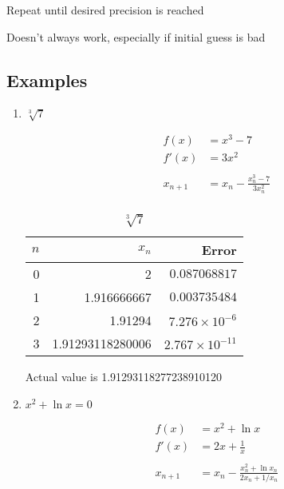 \documentclass[letterpaper, landscape]{exam}
\begin{document}
  \begin{itemize*}
    \item Repeat until desired precision is reached
    \item Doesn't always work, especially if initial guess is bad
  \end{itemize*}

  \subsection{Examples} %
  
  \begin{enumerate}
    \item $\sqrt[3]{7}$

      \begin{align*}
        f(x)      & = x^3 - 7\\
        f'(x)     & = 3x^2 \\
        \\
        x_{n + 1} & = x_n - \frac{x_n^3 - 7}{3x_n^2} \\
      \end{align*}

      \begin{table}[H]
        \centering
        \begin{tabular}[H]{rrr}
          \toprule
          $n$ & $x_n$            & Error \\
          \midrule
          0   & 2                & $0.087068817$ \\
          1   & 1.916666667      & $0.003735484$ \\
          2   & 1.91294          & $7.276 \times 10^{-6}$ \\
          3   & 1.91293118280006 & $2.767 \times 10^{-11}$ \\
          \bottomrule
        \end{tabular}
        \caption{$\sqrt[3]{7}$}
      \end{table}

      Actual value is 1.91293118277238910120 

    \item $x^2 + \ln x = 0$

      \begin{align*}
        f(x)      & = x^2 + \ln x \\
        f'(x)     & = 2x + \frac{1}{x} \\
        \\
        x_{n + 1} & = x_n - \frac{x_n^2 + \ln x_n}{2x_n + 1/x_n} \\
      \end{align*}


\end{enumerate}
\end{document}

